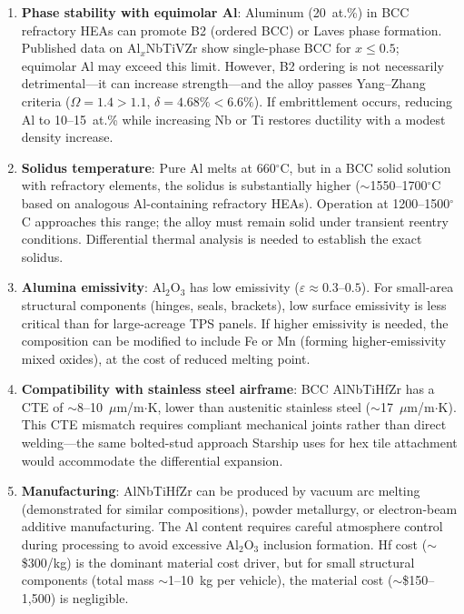 \documentclass[12pt,letterpaper]{article}
\theoremstyle{definition}
\begin{document}
\begin{enumerate}
  \item \textbf{Phase stability with equimolar Al}: Aluminum (20~at.\%) in BCC refractory HEAs can promote B2 (ordered BCC) or Laves phase formation.  Published data on Al$_x$NbTiVZr show single-phase BCC for $x \leq 0.5$; equimolar Al may exceed this limit.  However, B2 ordering is not necessarily detrimental---it can increase strength---and the alloy passes Yang--Zhang criteria ($\Omega = 1.4 > 1.1$, $\delta = 4.68\% < 6.6\%$).  If embrittlement occurs, reducing Al to 10--15~at.\% while increasing Nb or Ti restores ductility with a modest density increase.

  \item \textbf{Solidus temperature}: Pure Al melts at 660$^\circ$C, but in a BCC solid solution with refractory elements, the solidus is substantially higher ($\sim$1550--1700$^\circ$C based on analogous Al-containing refractory HEAs).  Operation at 1200--1500$^\circ$C approaches this range; the alloy must remain solid under transient reentry conditions.  Differential thermal analysis is needed to establish the exact solidus.

  \item \textbf{Alumina emissivity}: Al$_2$O$_3$ has low emissivity ($\varepsilon \approx 0.3$--$0.5$).  For small-area structural components (hinges, seals, brackets), low surface emissivity is less critical than for large-acreage TPS panels.  If higher emissivity is needed, the composition can be modified to include Fe or Mn (forming higher-emissivity mixed oxides), at the cost of reduced melting point.

  \item \textbf{Compatibility with stainless steel airframe}: BCC AlNbTiHfZr has a CTE of $\sim$8--10~$\mu$m/m$\cdot$K, lower than austenitic stainless steel ($\sim$17~$\mu$m/m$\cdot$K).  This CTE mismatch requires compliant mechanical joints rather than direct welding---the same bolted-stud approach Starship uses for hex tile attachment would accommodate the differential expansion.

  \item \textbf{Manufacturing}: AlNbTiHfZr can be produced by vacuum arc melting (demonstrated for similar compositions), powder metallurgy, or electron-beam additive manufacturing.  The Al content requires careful atmosphere control during processing to avoid excessive Al$_2$O$_3$ inclusion formation.  Hf cost ($\sim$\$300/kg) is the dominant material cost driver, but for small structural components (total mass $\sim$1--10~kg per vehicle), the material cost ($\sim$\$150--1,500) is negligible.
\end{enumerate}
\end{document}
